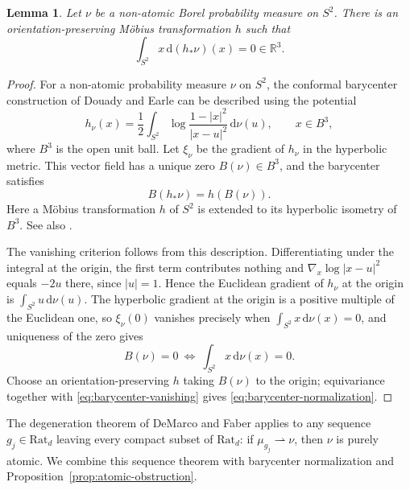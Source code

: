 \documentclass[11pt,reqno]{amsart}
\theoremstyle{plain}
\newtheorem{lemma}[theorem]{Lemma}
\theoremstyle{definition}
\theoremstyle{remark}
\newcommand{\R}{\mathbb R}
\newcommand{\dd}{\mathrm d}
\numberwithin{equation}{section}
\begin{document}
\begin{lemma}\label{lem:barycenter-normalization}
Let $\nu$ be a non-atomic Borel probability measure on $S^2$. There is an orientation-preserving M\"obius transformation $h$ such that
\begin{equation}\label{eq:barycenter-normalization}
 \int_{S^2}x\,\dd(h_*\nu)(x)=0\in\R^3.
\end{equation}
\end{lemma}

\begin{proof}
For a non-atomic probability measure $\nu$ on $S^2$, the conformal barycenter construction of Douady and Earle \cite[Section 11]{DE86} can be described using the potential
\[
 h_\nu(x)=\frac12\int_{S^2}\log\frac{1-|x|^2}{|x-u|^2}\,\dd\nu(u),
 \qquad x\in B^3,
\]
where $B^3$ is the open unit ball. Let $\xi_\nu$ be the gradient of $h_\nu$ in the hyperbolic metric. This vector field has a unique zero $B(\nu)\in B^3$, and the barycenter satisfies
\[
 B(h_*\nu)=h(B(\nu)).
\]
Here a M\"obius transformation $h$ of $S^2$ is extended to its hyperbolic isometry of $B^3$. See also \cite[Section 2]{Pet11}.

The vanishing criterion follows from this description. Differentiating under the integral at the origin, the first term contributes nothing and $\nabla_x\log|x-u|^2$ equals $-2u$ there, since $|u|=1$. Hence the Euclidean gradient of $h_\nu$ at the origin is $\int_{S^2}u\,\dd\nu(u)$. The hyperbolic gradient at the origin is a positive multiple of the Euclidean one, so $\xi_\nu(0)$ vanishes precisely when $\int_{S^2}x\,\dd\nu(x)=0$, and uniqueness of the zero gives
\begin{equation}\label{eq:barycenter-vanishing}
 B(\nu)=0\ \Longleftrightarrow\ \int_{S^2}x\,\dd\nu(x)=0.
\end{equation}
Choose an orientation-preserving $h$ taking $B(\nu)$ to the origin; equivariance together with \eqref{eq:barycenter-vanishing} gives \eqref{eq:barycenter-normalization}.
\end{proof}

The degeneration theorem of DeMarco and Faber \cite[Theorem A]{DF14} applies to any sequence $g_j\in\mathrm{Rat}_d$ leaving every compact subset of $\mathrm{Rat}_d$: if $\mu_{g_j}\rightharpoonup\nu$, then $\nu$ is purely atomic. We combine this sequence theorem with barycenter normalization and Proposition~\ref{prop:atomic-obstruction}.
\end{document}
